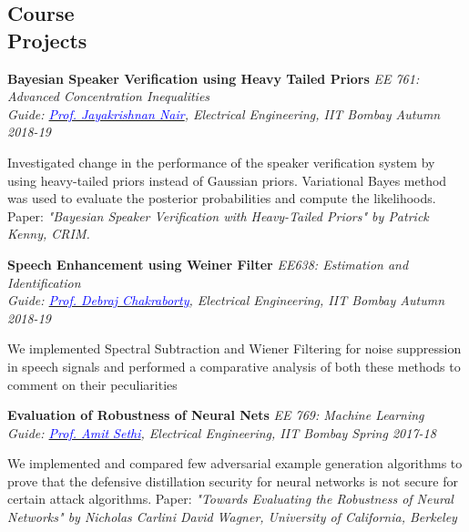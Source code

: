 \documentclass[margin,line, 9pt]{res}
\newenvironment{list1}{
  \begin{list}{\ding{113}}{%
      \setlength{\itemsep}{0in}
      \setlength{\parsep}{0in} \setlength{\parskip}{0in}
      \setlength{\topsep}{0in} \setlength{\partopsep}{0in} 
      \setlength{\leftmargin}{0.17in}}}{\end{list}}
\begin{document}
\begin{resume}
\section{\sc Course \\ Projects}
{\bf Bayesian Speaker Verification using Heavy Tailed Priors} \hfill {\it EE 761: Advanced Concentration Inequalities} \\
{\em Guide: \href{https://www.ee.iitb.ac.in/~jayakrishnan.nair/}{\textcolor{blue}{Prof. Jayakrishnan Nair}}, Electrical Engineering, IIT Bombay \hfill Autumn 2018-19} \\
\vspace*{-.15in}
\begin{list1}
\item[] Investigated change in the performance of the speaker verification system by using heavy-tailed priors instead of Gaussian priors. Variational Bayes method was used to evaluate the posterior probabilities and compute the likelihoods. Paper: \textit{"Bayesian Speaker Verification with Heavy-Tailed Priors" by Patrick Kenny, CRIM.} 
\end{list1}


{\bf Speech Enhancement using Weiner Filter} \hfill \textit{EE638: Estimation and Identification} \\
{\em Guide: \href{https://www.ee.iitb.ac.in/wiki/faculty/dc}{\textcolor{blue}{Prof. Debraj Chakraborty}}, Electrical Engineering, IIT Bombay \hfill Autumn 2018-19} \\
\vspace*{-.15in}
\begin{list1}
\item[] We implemented Spectral Subtraction and Wiener Filtering for noise suppression in speech signals and performed a comparative analysis of both these methods to comment on their peculiarities
\end{list1}

{\bf Evaluation of Robustness of Neural Nets} \hfill {\it EE 769: Machine Learning} \\
{\em Guide: \href{https://www.ee.iitb.ac.in/~asethi/}{\textcolor{blue}{Prof. Amit Sethi}}, Electrical Engineering, IIT Bombay \hfill Spring 2017-18} \\
\vspace*{-.15in}
\begin{list1}
\item[] We implemented and compared few adversarial example generation algorithms to prove that the defensive distillation security for neural networks is not secure for certain attack algorithms. Paper: \textit{"Towards Evaluating the Robustness of Neural Networks" by Nicholas Carlini David Wagner, University of California, Berkeley} 


\end{list1}
\end{resume}
\end{document}

